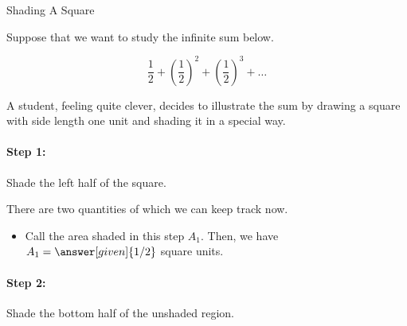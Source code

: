 \documentclass{ximera}
\begin{document}
\begin{example} Shading A Square

Suppose that we want to study the infinite sum below.

\[
\frac{1}{2} + \left(\frac{1}{2}\right)^2+ \left(\frac{1}{2}\right)^3+ \ldots
\]

A student, feeling quite clever, decides to illustrate the sum by drawing a square with side length one unit and shading it in a special way.  


\paragraph{Step 1:} Shade the left half of the square.  

\begin{image}[1in]

\end{image}
There are two quantities of which we can keep track now.
\begin{itemize}
\item Call the area shaded in this step $A_1$.  Then, we have $A_1=\answer[given]{1/2}$ square units.
\end{itemize}

\paragraph{Step 2:} Shade the bottom half of the unshaded region.  

\begin{image}[1in]
\end{image}
\end{example}
\end{document}

